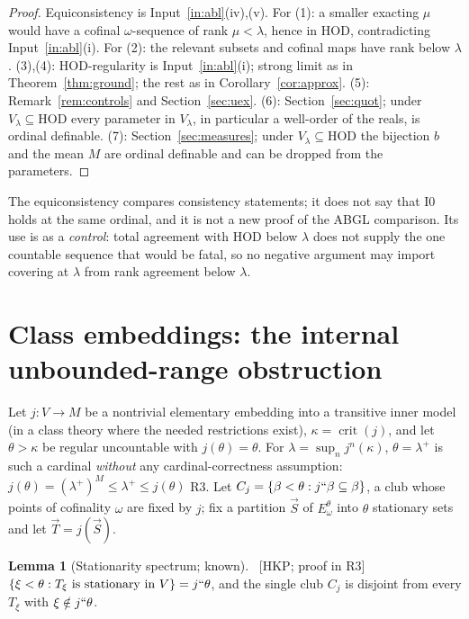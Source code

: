 \documentclass[11pt,letterpaper]{article}
\theoremstyle{definition}
\newtheorem{lemma}[definition]{Lemma}
\numberwithin{equation}{section}
\newcommand{\HOD}{\mathrm{HOD}}
\newcommand{\crit}{\operatorname{crit}}
\newcommand{\Izero}{\mathrm{I0}}
\newcommand{\src}[1]{\unskip\ {\normalfont\small\sffamily\color{Olive}[#1]}\ }
\newcommand{\R}[1]{\textsf{R#1}}
\begin{document}
\begin{proof}
Equiconsistency is Input~\ref{in:abl}(iv),(v). For (1): a smaller exacting $\mu$ would have a cofinal $\omega$-sequence of rank $\mu<\lambda$, hence in $\HOD$, contradicting Input~\ref{in:abl}(i). For (2): the relevant subsets and cofinal maps have rank below $\lambda$. (3),(4): $\HOD$-regularity is Input~\ref{in:abl}(i); strong limit as in Theorem~\ref{thm:ground}; the rest as in Corollary~\ref{cor:approx}. (5): Remark~\ref{rem:controls} and Section~\ref{sec:uex}. (6): Section~\ref{sec:quot}; under $V_\lambda\subseteq\HOD$ every parameter in $V_\lambda$, in particular a well-order of the reals, is ordinal definable. (7): Section~\ref{sec:measures}; under $V_\lambda\subseteq\HOD$ the bijection $b$ and the mean $M$ are ordinal definable and can be dropped from the parameters.
\end{proof}

The equiconsistency compares consistency statements; it does not say that $\Izero$ holds at the same ordinal, and it is not a new proof of the ABGL comparison. Its use is as a \emph{control}: total agreement with $\HOD$ below $\lambda$ does not supply the one countable sequence that would be fatal, so no negative argument may import covering at $\lambda$ from rank agreement below $\lambda$.

\section{Class embeddings: the internal unbounded-range obstruction}\label{sec:range}

Let $j:V\to M$ be a nontrivial elementary embedding into a transitive inner model (in a class theory where the needed restrictions exist), $\kappa=\crit(j)$, and let $\theta>\kappa$ be regular uncountable with $j(\theta)=\theta$. For $\lambda=\sup_nj^n(\kappa)$, $\theta=\lambda^+$ is such a cardinal \emph{without} any cardinal-correctness assumption: $j(\theta)=(\lambda^+)^M\le\lambda^+\le j(\theta)$ \R3. Let $C_j=\{\beta<\theta:j``\beta\subseteq\beta\}$, a club whose points of cofinality $\omega$ are fixed by $j$; fix a partition $\vec S$ of $E^\theta_\omega$ into $\theta$ stationary sets and let $\vec T=j(\vec S)$.

\begin{lemma}[Stationarity spectrum; known]\label{lem:spectrum}\src{HKP; proof in R3}
$\{\xi<\theta:T_\xi\text{ is stationary in }V\}=j``\theta$, and the single club $C_j$ is disjoint from every $T_\xi$ with $\xi\notin j``\theta$.
\end{lemma}
\end{document}
